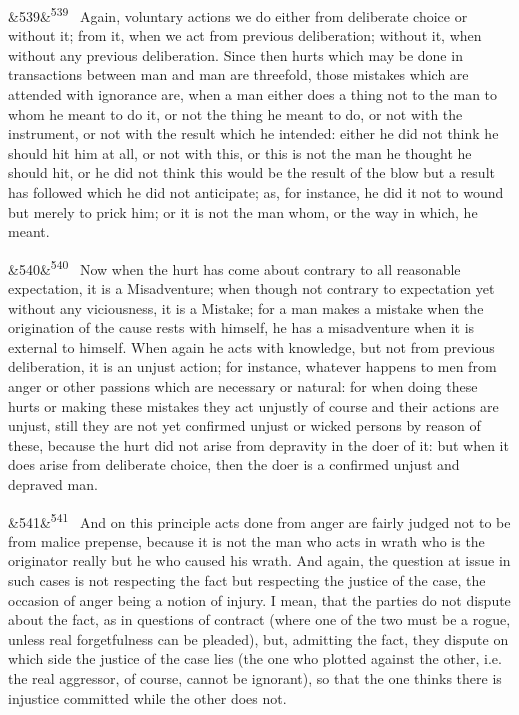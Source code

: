 \documentclass[12pt]{article}
\newcommand{\para}[1][]{\par\noindent\ifx&#1&\else\textsuperscript{\footnotesize #1}~\fi}
\begin{document}
\para[539] Again, voluntary actions we do either from deliberate choice or without it; from it, when we act from previous deliberation; without it, when without any previous deliberation. Since then hurts which may be done in transactions between man and man are threefold, those mistakes which are attended with ignorance are, when a man either does a thing not to the man to whom he meant to do it, or not the thing he meant to do, or not with the instrument, or not with the result which he intended: either he did not think he should hit him at all, or not with this, or this is not the man he thought he should hit, or he did not think this would be the result of the blow but a result has followed which he did not anticipate; as, for instance, he did it not to wound but merely to prick him; or it is not the man whom, or the way in which, he meant.

\para[540] Now when the hurt has come about contrary to all reasonable expectation, it is a Misadventure; when though not contrary to expectation yet without any viciousness, it is a Mistake; for a man makes a mistake when the origination of the cause rests with himself, he has a misadventure when it is external to himself. When again he acts with knowledge, but not from previous deliberation, it is an unjust action; for instance, whatever happens to men from anger or other passions which are necessary or natural: for when doing these hurts or making these mistakes they act unjustly of course and their actions are unjust, still they are not yet confirmed unjust or wicked persons by reason of these, because the hurt did not arise from depravity in the doer of it: but when it does arise from deliberate choice, then the doer is a confirmed unjust and depraved man.

\para[541] And on this principle acts done from anger are fairly judged not to be from malice prepense, because it is not the man who acts in wrath who is the originator really but he who caused his wrath. And again, the question at issue in such cases is not respecting the fact but respecting the justice of the case, the occasion of anger being a notion of injury. I mean, that the parties do not dispute about the fact, as in questions of contract (where one of the two must be a rogue, unless real forgetfulness can be pleaded), but, admitting the fact, they dispute on which side the justice of the case lies (the one who plotted against the other, i.e. the real aggressor, of course, cannot be ignorant), so that the one thinks there is injustice committed while the other does not.
\end{document}

